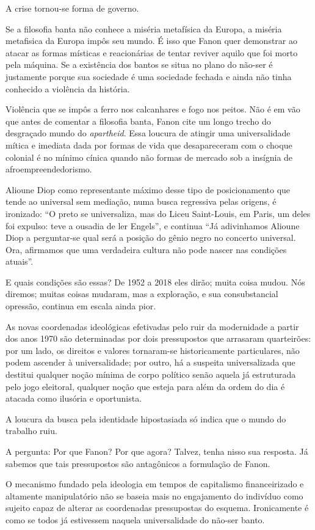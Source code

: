 A crise tornou-se forma de governo.

Se a filosofia banta não conhece a miséria metafísica da Europa, a
miséria metafisica da Europa impôs seu mundo. É isso que Fanon quer
demonstrar ao atacar as formas místicas e reacionárias de tentar reviver
aquilo que foi morto pela máquina. Se a existência dos bantos se situa
no plano do não-ser é justamente porque sua sociedade é uma sociedade
fechada e ainda não tinha conhecido a violência da história.

Violência que se impôs a ferro nos calcanhares e fogo nos peitos. Não é
em vão que antes de comentar a filosofia banta, Fanon cite um longo
trecho do desgraçado mundo do \emph{apartheid}. Essa loucura de atingir
uma universalidade mítica e imediata dada por formas de vida que
desapareceram com o choque colonial é no mínimo cínica quando não formas
de mercado sob a insígnia de afroempreendedorismo.

Alioune Diop como representante máximo desse tipo de posicionamento que
tende ao universal sem mediação, numa busca regressiva pelas origens, é
ironizado: ``O preto se universaliza, mas do Liceu Saint-Louis, em
Paris, um deles foi expulso: teve a ousadia de ler Engels'', e continua
``Já adivinhamos Alioune Diop a perguntar-se qual será a posição do
gênio negro no concerto universal. Ora, afirmamos que uma verdadeira
cultura não pode nascer nas condições atuais''.

E quais condições são essas? De 1952 a 2018 eles dirão; muita coisa
mudou. Nós diremos; muitas coisas mudaram, mas a exploração, e sua
consubstancial opressão, continua em escala ainda pior.

As novas coordenadas ideológicas efetivadas pelo ruir da modernidade a
partir dos anos 1970 são determinadas por dois pressupostos que
arrasaram quarteirões: por um lado, os direitos e valores tornaram-se
historicamente particulares, não podem ascender à universalidade; por
outro, há a suspeita universalizada que destitui qualquer noção mínima
de corpo político senão aquela já estruturada pelo jogo eleitoral,
qualquer noção que esteja para além da ordem do dia é atacada como
ilusória e oportunista.

A loucura da busca pela identidade hipostasiada só indica que o mundo do
trabalho ruiu.

A pergunta: Por que Fanon? Por que agora? Talvez, tenha nisso sua
resposta. Já sabemos que tais pressupostos são antagônicos a formulação
de Fanon.

O mecanismo fundado pela ideologia em tempos de capitalismo
financeirizado e altamente manipulatório não se baseia mais no
engajamento do indivíduo como sujeito capaz de alterar as coordenadas
pressupostas do esquema. Ironicamente é como se todos já estivessem
naquela universalidade do não-ser banto.

